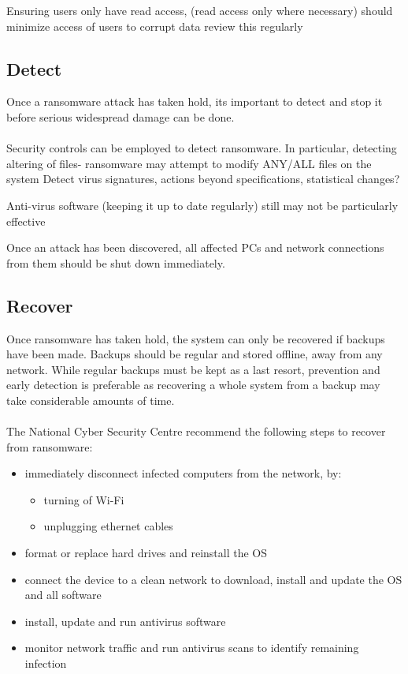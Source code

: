 \documentclass{article}
\begin{document}
 Ensuring users only have read access, (read access only where necessary) should minimize access of users to corrupt data
review this regularly

\subsection{Detect}
Once a ransomware attack has taken hold, its important to detect and stop it before serious widespread damage can be done.
\\\\
Security controls can be employed to detect ransomware.
In particular, detecting altering of files- ransomware may attempt to modify ANY/ALL files on the system
Detect virus signatures, actions beyond specifications, statistical changes?

Anti-virus software (keeping it up to date regularly)
still may not be particularly effective

Once an attack has been discovered, all affected PCs and network connections from them should be shut down immediately.

\subsection{Recover}
Once ransomware has taken hold, the system can only be recovered if backups have been made. Backups should be regular and stored offline, away from any network.
While regular backups must be kept as a last resort, prevention and early detection is preferable as recovering a whole system from a backup may take considerable amounts of time.
\\\\
The National Cyber Security Centre recommend the following steps to recover from ransomware\cite{ncsc_mitigating_malware}:
\begin{itemize}
	\item immediately disconnect infected computers from the network, by:
	\begin{itemize}
		\item turning of Wi-Fi
		\item unplugging ethernet cables
	\end{itemize}
	\item format or replace hard drives and reinstall the OS
	\item connect the device to a clean network to download, install and update the OS and all software
	\item install, update and run antivirus software
	\item monitor network traffic and run antivirus scans to identify remaining infection
\end{itemize}
\end{document}
